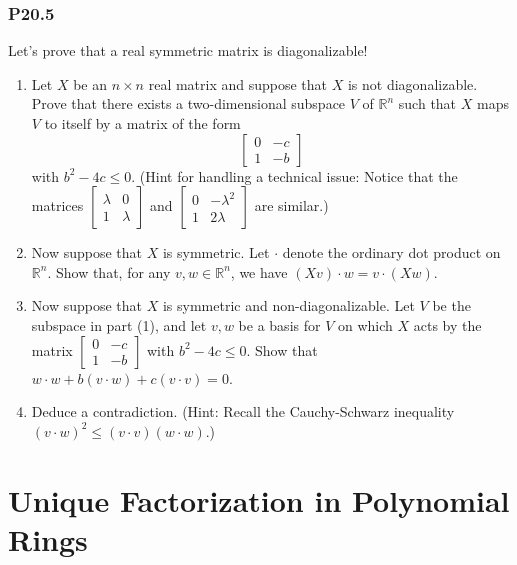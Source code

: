 \documentclass[lang=cn,11pt]{template}
\begin{document}
\subsection*{P20.5} Let’s prove that a real symmetric matrix is diagonalizable!
\begin{enumerate}
    \item Let \( X \) be an \( n \times n \) real matrix and suppose that \( X \) is not diagonalizable. Prove that there exists a two-dimensional subspace \( V \) of \( \mathbb{R}^n \) such that \( X \) maps \( V \) to itself by a matrix of the form
    \[
    \begin{bmatrix} 0 & -c \\ 1 & -b \end{bmatrix}
    \]
    with \( b^2 - 4c \leq 0 \). (Hint for handling a technical issue: Notice that the matrices \( \begin{bmatrix} \lambda & 0 \\ 1 & \lambda \end{bmatrix} \) and \( \begin{bmatrix} 0 & -\lambda^2 \\ 1 & 2\lambda \end{bmatrix} \) are similar.)
    \item Now suppose that \( X \) is symmetric. Let \( \cdot \) denote the ordinary dot product on \( \mathbb{R}^n \). Show that, for any \( v, w \in \mathbb{R}^n \), we have \( (Xv) \cdot w = v \cdot (Xw) \).
    \item Now suppose that \( X \) is symmetric and non-diagonalizable. Let \( V \) be the subspace in part (1), and let \( v, w \) be a basis for \( V \) on which \( X \) acts by the matrix \( \begin{bmatrix} 0 & -c \\ 1 & -b \end{bmatrix} \) with \( b^2 - 4c \leq 0 \). Show that \( w \cdot w + b(v \cdot w) + c(v \cdot v) = 0 \).
    \item Deduce a contradiction. (Hint: Recall the Cauchy-Schwarz inequality \( (v \cdot w)^2 \leq (v \cdot v)(w \cdot w) \).)
\end{enumerate}











\chapter{Unique Factorization in Polynomial Rings}
\end{document}
